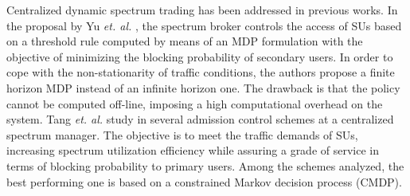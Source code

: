 %
%
%
%
%

Centralized dynamic spectrum trading has been addressed in previous works. In the proposal by Yu \textit{et. al.} \cite{ref:Yu2007}, the spectrum broker controls the access of SUs based on a threshold rule computed by means of an MDP formulation with the objective of minimizing the blocking probability of secondary users. In order to cope with the non-stationarity of traffic conditions, the authors propose a finite horizon MDP instead of an infinite horizon one. The drawback is that the policy cannot be computed off-line, imposing a high computational overhead on the system.
Tang \textit{et. al.} study in \cite{ref:Tang2009} several admission control schemes at a centralized spectrum manager. The objective is to meet the traffic demands of SUs, increasing spectrum utilization efficiency while assuring a grade of service in terms of blocking probability to primary users. Among the schemes analyzed, the best performing one is based on a constrained Markov decision process (CMDP).


